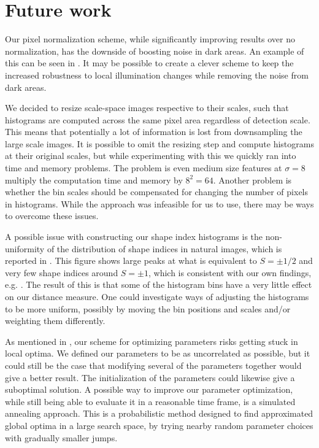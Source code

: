 \documentclass[thesis.tex]{subfiles}
\begin{document}
\section{Future work} %
%
Our pixel normalization scheme, while significantly improving results over no normalization, has the downside of boosting noise in dark areas. An example of this can be seen in . It may be possible to create a clever scheme to keep the increased robustness to local illumination changes while removing the noise from dark areas.

We decided to resize scale-space images respective to their scales, such that histograms are computed across the same pixel area regardless of detection scale. This means that potentially a lot of information is lost from downsampling the large scale images. It is possible to omit the resizing step and compute histograms at their original scales, but while experimenting with this we quickly ran into time and memory problems. The problem is even medium size features at $\sigma = 8$ multiply the computation time and memory by $8^2 = 64$. Another problem is whether the bin scales should be compensated for changing the number of pixels in histograms. While the approach was infeasible for us to use, there may be ways to overcome these issues.

A possible issue with constructing our shape index histograms is the non-uniformity of the distribution of shape indices in natural images, which is reported in \citep[Fig. 3]{lillholm2009statistics}. This figure shows large peaks at what is equivalent to $S = \pm 1/2$ and very few shape indices around $S = \pm 1$, which is consistent with our own findings, e.g. . The result of this is that some of the histogram bins have a very little effect on our distance measure. One could investigate ways of adjusting the histograms to be more uniform, possibly by moving the bin positions and scales and/or weighting them differently.

As mentioned in , our scheme for optimizing parameters risks getting stuck in local optima. We defined our parameters to be as uncorrelated as possible, but it could still be the case that modifying several of the parameters together would give a better result. The initialization of the parameters could likewise give a suboptimal solution. A possible way to improve our parameter optimization, while still being able to evaluate it in a reasonable time frame, is a simulated annealing approach. This is a probabilistic method designed to find approximated global optima in a large search space, by trying nearby random parameter choices with gradually smaller jumps. 
\end{document}
